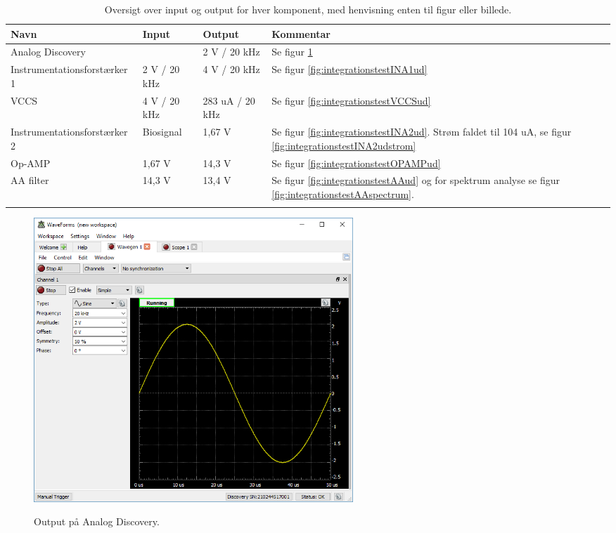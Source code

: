 \begin{table}[H]
\center
\begin{tabularx}{\linewidth}{l  X  X X}
     \textbf{Navn}	&	\textbf{Input}		&	\textbf{Output} & \textbf{Kommentar}\\ \midrule
     
     Analog Discovery	&		&	2 V / 20 kHz      & Se figur \ref{fig:integrationstestADud}  \\   \addlinespace[2mm]
     Instrumentationsforstærker 1	&	2 V / 20 kHz	&	4 V / 20 kHz      & Se figur \ref{fig:integrationstestINA1ud}  \\   \addlinespace[2mm]
     VCCS	&	4 V / 20 kHz	&	283 uA / 20 kHz      & Se figur  \ref{fig:integrationstestVCCSud}  \\   \addlinespace[2mm]
     Instrumentationsforstærker 2	&	Biosignal	&	1,67 V      & Se figur  \ref{fig:integrationstestINA2ud}. Strøm faldet til 104 uA, se figur \ref{fig:integrationstestINA2udstrom}  \\   \addlinespace[2mm]
     Op-AMP	&	1,67 V 	&	14,3 V      & Se figur  \ref{fig:integrationstestOPAMPud}  \\   \addlinespace[2mm]	
     AA filter	&	14,3 V 	&	13,4 V      & Se figur  \ref{fig:integrationstestAAud} og for spektrum analyse se figur \ref{fig:integrationstestAAspectrum}.  \\   \addlinespace[2mm]
     \bottomrule                                                                                                                   
    \end{tabularx}
    \caption {Oversigt over input og output for hver komponent, med henvisning enten til figur eller billede.}
    \label{tab:inout}
	
\end{table}


\begin{figure}[H] 
\centering
{\includegraphics[width=12cm]
{Figure/integrationstestADud}}
\caption{Output på Analog Discovery.}
\label{fig:integrationstestADud}
\end{figure}

